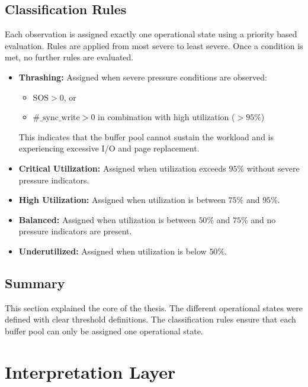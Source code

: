 \subsection{Classification Rules}

Each observation is assigned exactly one operational state using a priority based evaluation. Rules are applied from most severe to least severe. 
Once a condition is met, no further rules are evaluated.

\begin{itemize}
    
    \item \textbf{Thrashing:} 
    Assigned when severe pressure conditions are observed:
    \begin{itemize}
        \item $\mathrm{SOS} > 0$, or
        \item $\mathrm{\#\_sync\_write} > 0$ in combination with high utilization ($> 95\%$)
    \end{itemize}
    This indicates that the buffer pool cannot sustain the workload and is 
    experiencing excessive I/O and page replacement.
    
    \item \textbf{Critical Utilization:} 
    Assigned when utilization exceeds $95\%$ without severe pressure indicators.
    
    \item \textbf{High Utilization:} 
    Assigned when utilization is between $75\%$ and $95\%$.
    
    \item \textbf{Balanced:} 
    Assigned when utilization is between $50\%$ and $75\%$ and no pressure 
    indicators are present.
    
    \item \textbf{Underutilized:} 
    Assigned when utilization is below $50\%$.
    
\end{itemize}

\subsection{Summary}
This section explained the core of the thesis. The different operational states were defined with clear threshold definitions. The classification rules ensure that each buffer pool can only be assigned one operational state.  


\section{Interpretation Layer}


